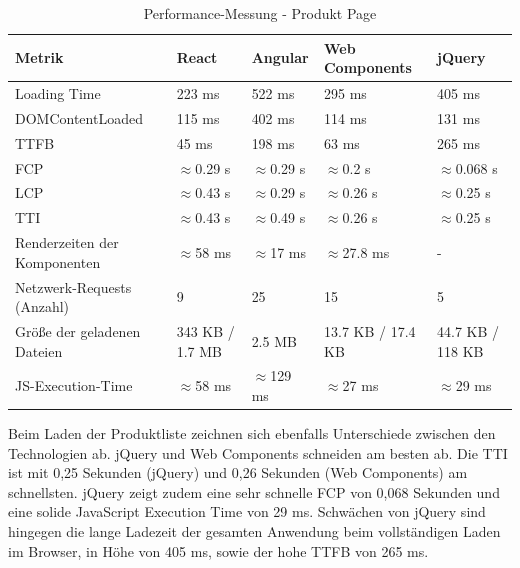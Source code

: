 \documentclass[oneside]{ausarbeitung}
\begin{document}
\begin{table}[H]
\centering
\caption{Performance-Messung - Produkt Page}
\begin{tabular}{|p{3.5cm}|p{2.5cm}|p{2.5cm}|p{2.5cm}|p{2.5cm}|}
\hline
\textbf{Metrik}                  & \textbf{React} & \textbf{Angular} & \textbf{Web Components} & \textbf{jQuery} \\ \hline
Loading Time                     & 223 ms        & 522 ms           & 295 ms                 & 405 ms          \\ \hline
DOMContentLoaded                 & 115 ms        & 402 ms           & 114 ms                 & 131 ms          \\ \hline
TTFB                             & 45 ms        & 198 ms           & 63 ms                  & 265 ms          \\ \hline
FCP                              & $\approx$0.29 s  & $\approx$0.29 s  & $\approx$0.2 s        & $\approx$0.068 s  \\ \hline
LCP                              & $\approx$0.43 s  & $\approx$0.29 s  & $\approx$0.26 s       & $\approx$0.25 s \\ \hline
TTI                              & $\approx$0.43 s  & $\approx$0.49 s  & $\approx$0.26 s       & $\approx$0.25 s \\ \hline
Renderzeiten der Komponenten     & $\approx$58 ms & $\approx$17 ms   & $\approx$27.8 ms          & -  \\ \hline
Netzwerk-Requests (Anzahl)       & 9              & 25               & 15                    & 5               \\ \hline
Größe der geladenen Dateien      & 343 KB / 1.7 MB & 2.5 MB          & 13.7 KB / 17.4 KB     & 44.7 KB / 118 KB \\ \hline
JS-Execution-Time                & $\approx$58 ms       & $\approx$129 ms          & $\approx$27 ms                & $\approx$29 ms         \\ \hline
\end{tabular}
\end{table}

Beim Laden der Produktliste zeichnen sich ebenfalls Unterschiede zwischen den Technologien ab. jQuery und Web Components schneiden am besten ab. Die TTI ist mit 0,25 Sekunden (jQuery) und 0,26 Sekunden (Web Components) am schnellsten. jQuery zeigt zudem eine sehr schnelle FCP von 0,068 Sekunden und eine solide JavaScript Execution Time von 29 ms. Schwächen von jQuery sind hingegen die lange Ladezeit der gesamten Anwendung beim vollständigen Laden im Browser, in Höhe von 405 ms, sowie der hohe TTFB von 265 ms.
\end{document}
